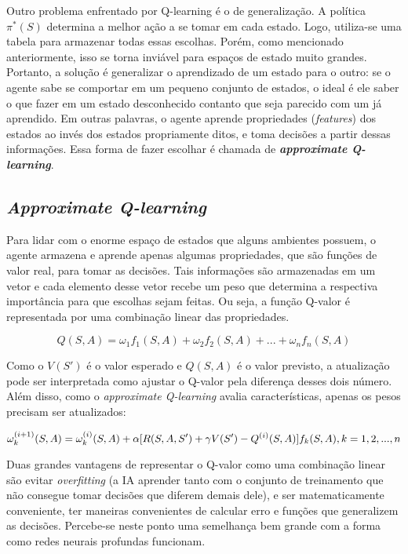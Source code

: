 Outro problema enfrentado por Q-learning é o de generalização. A política $\pi^{*}(S)$ determina a melhor ação a se tomar em cada estado. Logo, utiliza-se uma tabela para armazenar todas essas escolhas. Porém, como mencionado anteriormente, isso se torna inviável para espaços de estado muito grandes. Portanto, a solução é generalizar o aprendizado de um estado para o outro: se o agente sabe se comportar em um pequeno conjunto de estados, o ideal é ele saber o que fazer em um estado desconhecido contanto que seja parecido com um já aprendido. Em outras palavras, o agente aprende propriedades (\textit{features}) dos estados ao invés dos estados propriamente ditos, e toma decisões a partir dessas informações. Essa forma de fazer escolhar é chamada de \textit{\textbf{approximate Q-learning}}.

\subsection{\textit{Approximate Q-learning}}
\label{sec:aql}

Para lidar com o enorme espaço de estados que alguns ambientes possuem, o agente armazena e aprende apenas algumas propriedades, que são funções de valor real, para tomar as decisões. Tais informações são armazenadas em um vetor e cada elemento desse vetor recebe um peso que determina a respectiva importância para que escolhas sejam feitas. Ou seja, a função Q-valor é representada por uma combinação linear das propriedades.

\begin{equation} \label{eq:q_lin_comb}
Q(S,A) = \omega_{1}f_{1}(S,A) + \omega_{2}f_{2}(S,A) + ... + \omega_{n}f_{n}(S,A)
\end{equation}

Como o $V(S')$ é o valor esperado e $Q(S,A)$ é o valor previsto, a atualização pode ser interpretada como ajustar o Q-valor pela diferença desses dois número. Além disso, como o \textit{approximate Q-learning} avalia características, apenas os pesos precisam ser atualizados:

\begin{equation} \label{eq:w_update}
\omega_{k}^{(i+1)}(S,A) = \omega_{k}^{(i)}(S,A) + \alpha[R(S,A,S') + \gamma V(S') - Q^{(i)}(S,A)]f_{k}(S,A), \hfill k = 1, 2, ..., n
\end{equation}

Duas grandes vantagens de representar o Q-valor como uma combinação linear são evitar \textit{overfitting} (a IA aprender tanto com o conjunto de treinamento que não consegue tomar decisões que diferem demais dele), e ser matematicamente conveniente, ter maneiras convenientes de calcular erro e funções que generalizem as decisões.
Percebe-se neste ponto uma semelhança bem grande com a forma como redes neurais profundas funcionam.
